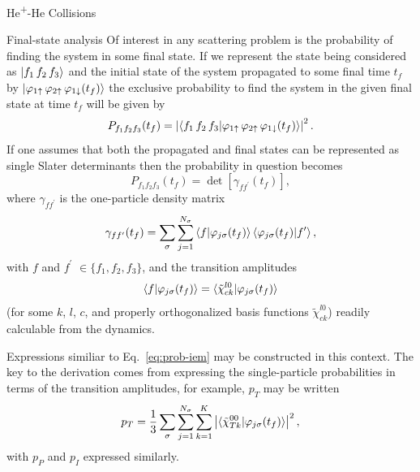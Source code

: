 \documentclass[letterpaper, 11 pt]{report}
\begin{document}
\begin{chapter}{\texorpdfstring{He\textsuperscript{+}}{He+}-He Collisions \label{chap:hephe}}
\begin{section}{Final-state analysis \label{sec:hephe-det}}
      Of interest in any scattering problem is the probability of finding the system in some final state.
      If we represent the state being considered as $\ket{f_1 \, f_2 \, f_3}$ and the initial state of
      the system propagated to some final time $t_f$ by $\ket{\varphi_{1 \uparrow} \,
      \varphi_{2 \uparrow} \, \varphi_{1 \downarrow} (t_f)}$ the exclusive probability to find the
      system in the given final state at time $t_f$ will be given by
      \begin{equation} \label{eq:finalProb}
         P_{f_1 f_2 f_3}(t_f) = \left| \braket{ f_1 \, f_2 \, f_3 | \varphi_{1 \uparrow} \,
                                       \varphi_{2 \uparrow} \, \varphi_{1 \downarrow} (t_f) } \right|^2.
      \end{equation}
      If one assumes that both the propagated and final states can be represented as single Slater
      determinants then the probability in question becomes
      \begin{equation} \label{eq:detProb}
         P_{f_1 f_2 f_3}(t_f) = \det \left[ \gamma_{f f^\prime}(t_f) \right],
      \end{equation}
      where $\gamma_{f f^\prime}$ is the one-particle density matrix
      \begin{equation} \label{eq:denmat}
         \gamma_{f f^\prime}(t_f) = \sum\limits_{\sigma} \sum\limits_{j = 1}^{N_\sigma}
                               \braket{f | \varphi_{j \sigma}(t_f)}
                               \braket{\varphi_{j \sigma}(t_f) | f^\prime},
      \end{equation}
      with $f$ and $f^\prime$ $\in \{f_1, f_2, f_3\}$, and the transition amplitudes
      \begin{equation}
         \braket{f | \varphi_{j \sigma}(t_f)}
         = \braket{\tilde{\chi}^{l0}_{c k} | \varphi_{j \sigma}(t_f)}
      \end{equation}
      (for some $k$, $l$, $c$, and properly orthogonalized basis functions $\tilde{\chi}^{l0}_{c k}$)
      readily calculable from the dynamics.

      Expressions similiar to Eq.~\eqref{eq:prob-iem} may be constructed in this
      context. The key to the derivation comes from expressing the single-particle probabilities in
      terms of the transition amplitudes, for example, $p_T$ may be written
      \begin{equation} \label{eq:ptTrans}
         p_T = \frac{1}{3} \sum\limits_{\sigma} \sum\limits_{j = 1}^{N_\sigma} \sum\limits_{k = 1}^{K}
               \left| \braket{ \tilde{\chi}^{00}_{T k} | \varphi_{j \sigma}(t_f)}\right|^2,
      \end{equation}
      with $p_P$ and $p_I$ expressed similarly.


\end{section}
\end{chapter}
\end{document}
